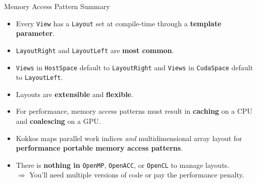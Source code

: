 \begin{frame}{Memory Access Pattern Summary}

  \begin{itemize}
    \item{Every \texttt{View} has a \texttt{Layout} set at compile-time through a \textbf{template parameter}.}
    \item{\texttt{LayoutRight} and \texttt{LayoutLeft} are \textbf{most common}.}
    \item{\texttt{Views} in \texttt{HostSpace} default to \texttt{LayoutRight} and \texttt{Views} in \texttt{CudaSpace} default to \texttt{LayoutLeft}.}
    \item{Layouts are \textbf{extensible} and \textbf{flexible}.}
    \item{For performance, memory access patterns must result in \textbf{caching} on a CPU and \textbf{coalescing} on a GPU.}
    \item{Kokkos maps parallel work indices \textit{and} multidimensional array layout for \textbf{performance portable memory access patterns}.}
    \item{There is \textbf{nothing in} \texttt{OpenMP}, \texttt{OpenACC}, or \texttt{OpenCL} to manage layouts.}\\
    $\Rightarrow$ You'll need multiple versions of code or pay the performance penalty.
  \end{itemize}

\end{frame}
